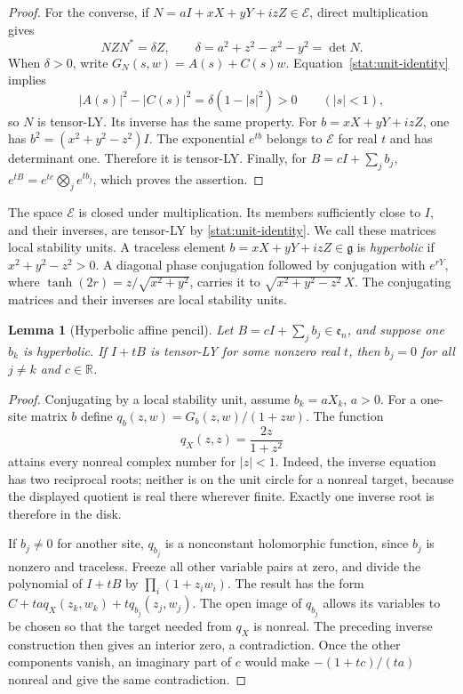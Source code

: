 \documentclass[reqno]{amsart}
\newtheorem{lemma}[theorem]{Lemma}
\theoremstyle{definition}
\theoremstyle{remark}
\newcommand{\R}{\mathbb R}
\begin{document}
\begin{proof}
For the converse, if
\(N=aI+xX+yY+izZ\in\mathcal E\), direct multiplication gives
\begin{equation}
 NZN^*=\delta Z,
 \qquad \delta=a^2+z^2-x^2-y^2=\det N.
 \label{stat:unit-identity}
\end{equation}
When \(\delta>0\), write
\(G_N(s,w)=A(s)+C(s)w\).  Equation~\eqref{stat:unit-identity}
implies
\[
 |A(s)|^2-|C(s)|^2=\delta(1-|s|^2)>0\qquad(|s|<1),
\]
so \(N\) is tensor-LY.  Its inverse has the same property.
For \(b=xX+yY+izZ\), one has \(b^2=(x^2+y^2-z^2)I\).
The exponential \(e^{tb}\) belongs to \(\mathcal E\) for real
\(t\) and has determinant one.  Therefore it is tensor-LY.  Finally,
for \(B=cI+\sum_jb_j\),
\(e^{tB}=e^{tc}\bigotimes_j e^{tb_j}\), which proves the assertion.
\end{proof}

The space \(\mathcal E\) is closed under multiplication.  Its members
sufficiently close to \(I\), and their inverses, are tensor-LY by
\eqref{stat:unit-identity}.  We call these matrices local stability
units.  A traceless element \(b=xX+yY+izZ\in\mathfrak g\) is
\emph{hyperbolic} if \(x^2+y^2-z^2>0\).  A diagonal phase
conjugation followed by conjugation with \(e^{rY}\), where
\(\tanh(2r)=z/\sqrt{x^2+y^2}\), carries it to
\(\sqrt{x^2+y^2-z^2}\,X\).  The conjugating matrices and their
inverses are local stability units.

\begin{lemma}[Hyperbolic affine pencil]
\label{stat:hyperbolic}
Let \(B=cI+\sum_jb_j\in\mathfrak e_n\), and suppose one
\(b_k\) is hyperbolic.  If \(I+tB\) is tensor-LY for some nonzero
real \(t\), then \(b_j=0\) for all \(j\ne k\) and \(c\in\R\).
\end{lemma}

\begin{proof}
Conjugating by a local stability unit, assume \(b_k=aX_k\),
\(a>0\).  For a one-site matrix \(b\) define
\(q_b(z,w)=G_b(z,w)/(1+zw)\).  The function
\[
 q_X(z,z)=\frac{2z}{1+z^2}
\]
attains every nonreal complex number for \(|z|<1\).  Indeed, the
inverse equation has two reciprocal roots; neither is on the unit
circle for a nonreal target, because the displayed quotient is real
there wherever finite.  Exactly one inverse root is therefore in
the disk.

If \(b_j\ne0\) for another site, \(q_{b_j}\) is a nonconstant
holomorphic function, since \(b_j\) is nonzero and traceless.
Freeze all other variable pairs at zero, and divide the polynomial
of \(I+tB\) by \(\prod_i(1+z_iw_i)\).  The result has the form
\(C+taq_X(z_k,w_k)+tq_{b_j}(z_j,w_j)\).  The open image of
\(q_{b_j}\) allows its variables to be chosen so that the target
needed from \(q_X\) is nonreal.  The preceding inverse construction
then gives an interior zero, a contradiction.  Once the other
components vanish, an imaginary part of \(c\) would make
\(-(1+tc)/(ta)\) nonreal and give the same contradiction.
\end{proof}
\end{document}
